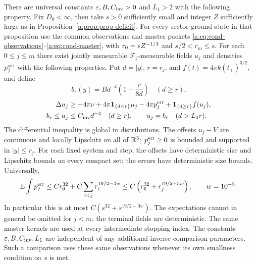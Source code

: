 \begin{proposition}
\label{prop:atomic-intermediate}
There are universal constants $\varepsilon,B,C_{\rm inv}>0$ and $L_1>2$
with the following property. Fix $D_0<\infty$, then take $s>0$
sufficiently small and integer $Z$ sufficiently large as in
Proposition~\ref{a:prop:prop-deficit}. For every sector ground state in
that proposition use the common observations and master packets
\eqref{a:eq:cond-observations}--\eqref{a:eq:cond-master}, with
$r_0=\varepsilon Z^{-1/3}$ and $s/2<r_m\le s$.
For each $0\le j\le m$ there exist jointly measurable
$\mathcal F_j$-measurable fields $u_j$ and densities $p_j^{\rm err}$
with the following properties. Put $d=|y|$, $r=r_j$, and
$f(t)=4\pi k(t_+)^{3/2}$, and define
\[
 b_r(y)=Bd^{-4}\left(1-\frac r{8d}\right)\quad(d\ge r).
\]
\begin{equation}
\label{a:eq:prop-invariant}
 \begin{split}
 \Delta u_j&\ge-4\pi\nu+4\pi\mathbf 1_{\{d<r\}}\mu_j
       -4\pi p_j^{\mathrm{err}}+\mathbf 1_{\{d\ge r\}}f(u_j),\\
 b_r\le u_j&\le C_{\mathrm{inv}}d^{-4}\quad(d\ge r),
 \qquad u_j=b_r\quad(d>L_1r).
 \end{split}
\end{equation}
The differential inequality is global in distributions.
The offsets $u_j-V$ are continuous and locally Lipschitz on all of
$\mathbb R^3$; $p_j^{\rm err}\ge0$ is bounded and supported in $|y|\le r_j$.
For each fixed system and step, the offsets have deterministic size
and Lipschitz bounds on every compact set; the errors have deterministic
size bounds. Universally,
\begin{equation}\label{eq:atomic-prefix-error}
 \mathbb E\int p_j^{\rm err}
 \le C r_0^{32}+C\sum_{i<j}r_i^{19/2-3w}
 \le C\left(r_0^{32}+r_j^{19/2-3w}\right),\qquad w=10^{-5}.
\end{equation}
In particular this is at most $C(s^{32}+s^{19/2-3w})$.
The expectations cannot in general be omitted for $j<m$; the terminal
fields are deterministic. The same master kernels are used at every
intermediate stopping index. The constants $\varepsilon,B,C_{\rm inv},L_1$
are independent of any additional inverse-comparison parameters.
Such a comparison uses these same observations whenever its own
smallness condition on $s$ is met.
\end{proposition}

